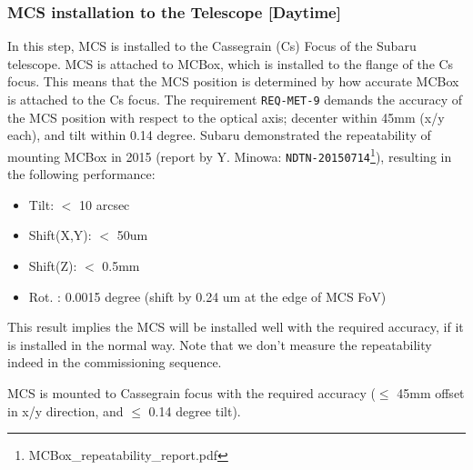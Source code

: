 \subsubsection{MCS installation to the Telescope [Daytime]}\label{secflow:MCSinstall}

In this step, MCS is installed to the Cassegrain (Cs) Focus of the Subaru telescope.
MCS is attached to MCBox, which is installed to the flange of the Cs focus. 
This means that the MCS position is determined by how accurate MCBox is attached to the Cs focus.
The requirement {\tt REQ-MET-9} demands the accuracy of the MCS position with respect to the optical axis; decenter within 45mm (x/y each), and tilt within 0.14 degree.
Subaru demonstrated the repeatability of mounting MCBox in 2015 (report by Y. Minowa: {\tt NDTN-20150714}\footnote{MCBox\_repeatability\_report.pdf}), resulting in the following performance:
\begin{itemize}
\item Tilt: $<$ 10 arcsec
\item Shift(X,Y): $<$ 50um
\item Shift(Z): $<$ 0.5mm
\item Rot. : 0.0015 degree (shift by 0.24 um at the edge of MCS FoV)
\end{itemize}
This result implies the MCS will be installed well with the required accuracy, if it is installed in the normal way.
Note that we don't measure the repeatability indeed in the commissioning sequence.





\begin{itembox}[l]{}
MCS is mounted to Cassegrain focus with the required accuracy ($\leq$ 45mm offset in x/y direction, and $\leq$ 0.14 degree tilt). 

\end{itembox}